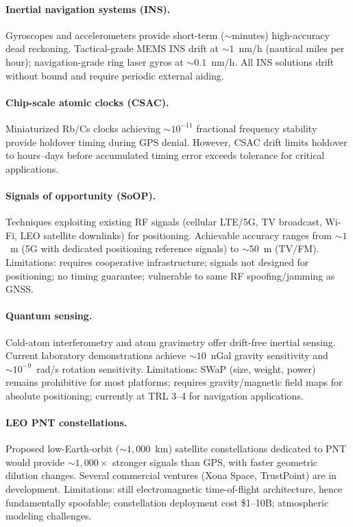 \documentclass[aps,prd,twocolumn,superscriptaddress,nofootinbib,floatfix]{revtex4-2}
\begin{document}
\paragraph{Inertial navigation systems (INS).}
Gyroscopes and accelerometers provide short-term ($\sim$minutes)
high-accuracy dead reckoning. Tactical-grade MEMS INS drift at $\sim 1$~nm/h
(nautical miles per hour); navigation-grade ring laser gyros at
$\sim 0.1$~nm/h. All INS solutions drift without bound and require
periodic external aiding.

\paragraph{Chip-scale atomic clocks (CSAC).}
Miniaturized Rb/Cs clocks achieving $\sim 10^{-11}$ fractional frequency
stability provide holdover timing during GPS denial. However, CSAC drift
limits holdover to hours--days before accumulated timing error exceeds
tolerance for critical applications.

\paragraph{Signals of opportunity (SoOP).}
Techniques exploiting existing RF signals (cellular LTE/5G, TV broadcast,
Wi-Fi, LEO satellite downlinks) for positioning. Achievable accuracy
ranges from $\sim 1$~m (5G with dedicated positioning reference signals) to
$\sim 50$~m (TV/FM). Limitations: requires cooperative infrastructure;
signals not designed for positioning; no timing guarantee; vulnerable to
same RF spoofing/jamming as GNSS.

\paragraph{Quantum sensing.}
Cold-atom interferometry and atom gravimetry offer drift-free inertial
sensing. Current laboratory demonstrations achieve $\sim 10$~nGal gravity
sensitivity and $\sim 10^{-9}$~rad/s rotation sensitivity. Limitations:
SWaP (size, weight, power) remains prohibitive for most platforms; requires
gravity/magnetic field maps for absolute positioning; currently at TRL 3--4
for navigation applications.

\paragraph{LEO PNT constellations.}
Proposed low-Earth-orbit ($\sim 1{,}000$~km) satellite constellations
dedicated to PNT would provide $\sim 1{,}000\times$ stronger signals than
GPS, with faster geometric dilution changes. Several commercial ventures
(Xona Space, TrustPoint) are in development. Limitations: still
electromagnetic time-of-flight architecture, hence fundamentally spoofable;
constellation deployment cost \$1--10B; atmospheric modeling challenges.
\end{document}
